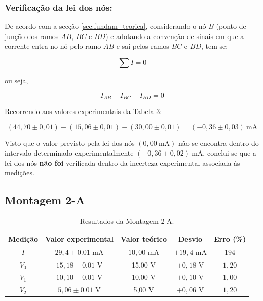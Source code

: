 \subsubsection{Verificação da lei dos nós:}

De acordo com a secção \ref{sec:fundam_teorica}, considerando o nó $B$ (ponto de junção dos ramos $AB$, $BC$ e $BD$) e adotando a convenção de sinais em que a corrente entra no nó pelo ramo $AB$ e sai pelos ramos $BC$ e $BD$, tem-se:

\begin{equation*}
	\sum I = 0
\end{equation*}

ou seja,

\begin{equation*}
	I_{AB}-I_{BC}-I_{BD}=0
\end{equation*}

Recorrendo aos valores experimentais da Tabela 3:

\begin{equation*}
	(44,70 \pm 0,01) - (15,06 \pm 0,01) - (30,00 \pm 0,01)
	= (-0,36 \pm 0,03)\ \text{mA}
\end{equation*}

Visto que o valor previsto pela lei dos nós $(0,00\ \text{mA})$ não se encontra dentro do intervalo determinado experimentalmente $(-0,36 \pm 0,02)\ \text{mA}$, conclui-se que a lei dos nós \textbf{não foi} verificada dentro da incerteza experimental associada às medições.


\subsection{Montagem 2-A}
\begin{table}[H]
	\centering
	\caption{Resultados da Montagem 2-A.}
	\begin{tabular}{|c|c|c|c|c|}
		\hline
		\textbf{Medição} & \textbf{Valor experimental} & \textbf{Valor teórico} & \textbf{Desvio} & \textbf{Erro (\%)} \\
		\hline
		$I$              & $29,4 \pm 0.01$ mA          & $10,00$ mA             & $+19,4$ mA      & $194$              \\
		\hline
		$V_0$            & $15,18 \pm 0.01$ V          & 15,00 V                & $+0,18$ V       & $1,20$             \\
		\hline
		$V_1$            & $10,10 \pm 0.01$ V          & 10,00 V                & $ +0,10$ V      & $1,00$             \\
		\hline
		$V_2$            & $5,06 \pm 0.01$ V           & 5,00 V                 & $ +0,06$ V      & $1,20$             \\
		\hline
	\end{tabular}
\end{table}
